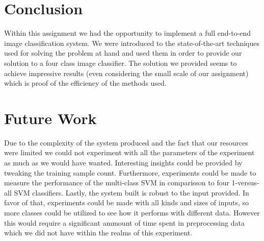 \documentclass[11pt]{article}
\begin{document}
\section{Conclusion}
Within this assignment we had the opportunity to implement a full end-to-end image classification system. We were introduced to the state-of-the-art techniques used for solving the problem at hand and used them in order to provide our solution to a four class image classifier. The solution we provided seems to achieve impressive results (even considering the small scale of our assignment) which is proof of the efficiency of the methods used.

\section{Future Work}
Due to the complexity of the system produced and the fact that our resources were limited we could not experiment with all the parameters of the experiment as much as we would have wanted. Interesting insights could be provided by tweaking the training sample count. Furthermore, experiments could be made to measure the performance of the multi-class SVM in comparisson to four 1-versus-all SVM classifiers. Lastly, the system built is robust to the input provided. In favor of that, experiments could be made with all kinds and sizes of inputs, so more classes could be utilized to see how it performs with different data. However this would require a significant ammount of time spent in preprocessing data which we did not have within the realms of this experiment.

{}

\end{document}
